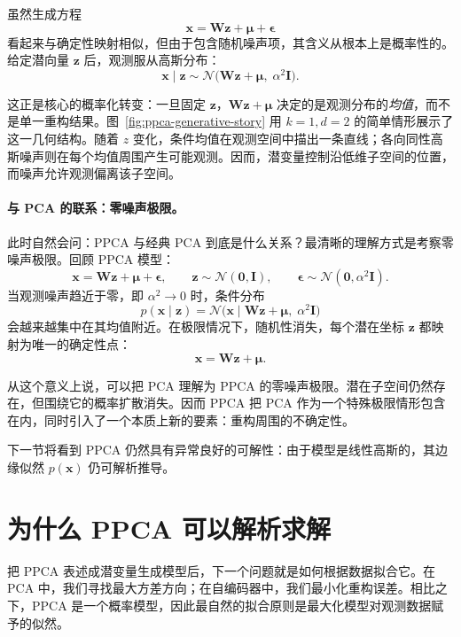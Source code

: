 虽然生成方程
\[
\mathbf{x}=\mathbf{W}\mathbf{z}+\boldsymbol{\mu}+\boldsymbol{\epsilon}
\]
看起来与确定性映射相似，但由于包含随机噪声项，其含义从根本上是概率性的。给定潜向量 \(\mathbf{z}\) 后，观测服从高斯分布：
\[
\mathbf{x}\mid\mathbf{z}
\sim
\mathcal{N}\!\bigl(\mathbf{W}\mathbf{z}+\boldsymbol{\mu},\;\alpha^2\mathbf{I}\bigr).
\]

这正是核心的概率化转变：一旦固定 \(\mathbf{z}\)，\(\mathbf{W}\mathbf{z}+\boldsymbol{\mu}\) 决定的是观测分布的\emph{均值}，而不是单一重构结果。图~\ref{fig:ppca-generative-story} 用 \(k=1,d=2\) 的简单情形展示了这一几何结构。随着 \(z\) 变化，条件均值在观测空间中描出一条直线；各向同性高斯噪声则在每个均值周围产生可能观测。因而，潜变量控制沿低维子空间的位置，而噪声允许观测偏离该子空间。



\paragraph{与 PCA 的联系：零噪声极限。}

此时自然会问：PPCA 与经典 PCA 到底是什么关系？最清晰的理解方式是考察零噪声极限。回顾 PPCA 模型：
\[
\mathbf{x}=\mathbf{W}\mathbf{z}+\boldsymbol{\mu}+\boldsymbol{\epsilon},
\qquad
\mathbf{z}\sim\mathcal{N}(\mathbf{0},\mathbf{I}),
\qquad
\boldsymbol{\epsilon}\sim\mathcal{N}(\mathbf{0},\alpha^2\mathbf{I}).
\]
当观测噪声趋近于零，即 \(\alpha^2\to0\) 时，条件分布
\[
p(\mathbf{x}\mid\mathbf{z})
=
\mathcal{N}\!\bigl(\mathbf{x}\mid\mathbf{W}\mathbf{z}+\boldsymbol{\mu},\;\alpha^2\mathbf{I}\bigr)
\]
会越来越集中在其均值附近。在极限情况下，随机性消失，每个潜在坐标 \(\mathbf{z}\) 都映射为唯一的确定性点：
\[
\mathbf{x}=\mathbf{W}\mathbf{z}+\boldsymbol{\mu}.
\]

从这个意义上说，可以把 PCA 理解为 PPCA 的零噪声极限。潜在子空间仍然存在，但围绕它的概率扩散消失。因而 PPCA 把 PCA 作为一个特殊极限情形包含在内，同时引入了一个本质上新的要素：重构周围的不确定性。

下一节将看到 PPCA 仍然具有异常良好的可解性：由于模型是线性高斯的，其边缘似然 \(p(\mathbf{x})\) 仍可解析推导。

\section{为什么 PPCA 可以解析求解}

把 PPCA 表述成潜变量生成模型后，下一个问题就是如何根据数据拟合它。在 PCA 中，我们寻找最大方差方向；在自编码器中，我们最小化重构误差。相比之下，PPCA 是一个概率模型，因此最自然的拟合原则是最大化模型对观测数据赋予的似然。


